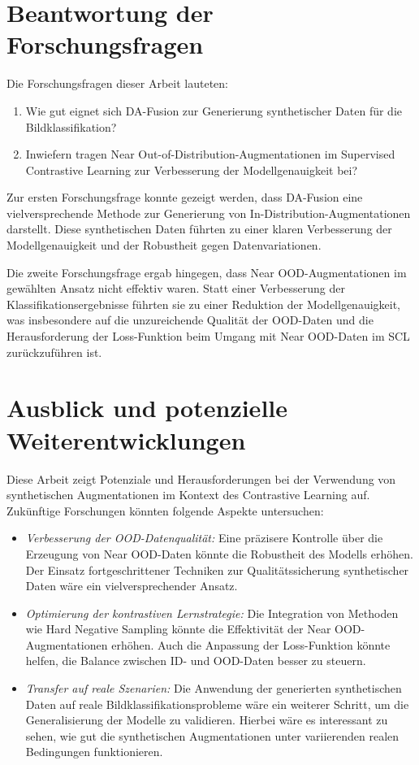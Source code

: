 \section{Beantwortung der Forschungsfragen} \label{sec:research-questions-answers}

Die Forschungsfragen dieser Arbeit lauteten:

\begin{enumerate}
    \item Wie gut eignet sich DA-Fusion zur Generierung synthetischer Daten für die Bildklassifikation? \item Inwiefern tragen Near Out-of-Distribution-Augmentationen im Supervised Contrastive Learning zur Verbesserung der Modellgenauigkeit bei?
\end{enumerate}

Zur ersten Forschungsfrage konnte gezeigt werden, dass DA-Fusion eine vielversprechende Methode zur Generierung von In-Distribution-Augmentationen darstellt. Diese synthetischen Daten führten zu einer klaren Verbesserung der Modellgenauigkeit und der Robustheit gegen Datenvariationen.

Die zweite Forschungsfrage ergab hingegen, dass Near OOD-Augmentationen im gewählten Ansatz nicht effektiv waren. Statt einer Verbesserung der Klassifikationsergebnisse führten sie zu einer Reduktion der Modellgenauigkeit, was insbesondere auf die unzureichende Qualität der OOD-Daten und die Herausforderung der Loss-Funktion beim Umgang mit Near OOD-Daten im SCL zurückzuführen ist.

\section{Ausblick und potenzielle Weiterentwicklungen} \label{sec:outlook}

Diese Arbeit zeigt Potenziale und Herausforderungen bei der Verwendung von synthetischen Augmentationen im Kontext des Contrastive Learning auf. Zukünftige Forschungen könnten folgende Aspekte untersuchen:

\begin{itemize}
    \item \emph{Verbesserung der OOD-Datenqualität:} Eine präzisere Kontrolle über die Erzeugung von Near OOD-Daten könnte die Robustheit des Modells erhöhen. Der Einsatz fortgeschrittener Techniken zur Qualitätssicherung synthetischer Daten wäre ein vielversprechender Ansatz.
    \item \emph{Optimierung der kontrastiven Lernstrategie:} Die Integration von Methoden wie Hard Negative Sampling könnte die Effektivität der Near OOD-Augmentationen erhöhen. Auch die Anpassung der Loss-Funktion könnte helfen, die Balance zwischen ID- und OOD-Daten besser zu steuern.
    \item \emph{Transfer auf reale Szenarien:} Die Anwendung der generierten synthetischen Daten auf reale Bildklassifikationsprobleme wäre ein weiterer Schritt, um die Generalisierung der Modelle zu validieren. Hierbei wäre es interessant zu sehen, wie gut die synthetischen Augmentationen unter variierenden realen Bedingungen funktionieren.
\end{itemize}

